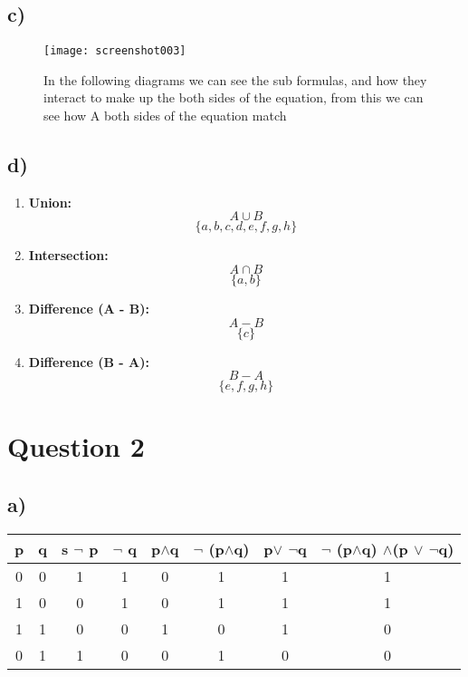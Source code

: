 \documentclass[english,10pt,a4paper]{report}
\begin{document}
\pagebreak
\subsection*{c)}
\begin{figure}[tbph!]
	\centering
	\texttt{[image: screenshot003]}
	\caption{In the following diagrams we can see the sub formulas, and how they interact to make up the both sides of the equation, from this we can see how A both sides of the equation match}
	\label{fig:screenshot003}
\end{figure}

\pagebreak

\subsection*{d)}


\hspace{2cm}
\begin{minipage}{\dimexpr\textwidth-2cm}
	\begin{enumerate}
		\item \textbf{Union:} \\
		\[
		A \cup B
		\]
		\[
		\{a,b,c,d,e,f,g,h\}
		\]
		\item \textbf{Intersection:} \\
		\[
		A \cap B
		\]
		\[
		\{a,b\}
		\]
		\item \textbf{Difference (A - B):} \\
		\[
		A - B
		\]
		\[
		\{c\}
		\]
		\item \textbf{Difference (B - A):} \\
		\[
		B - A
		\]
		\[
		\{e,f,g,h\}
		\]
	\end{enumerate}
\end{minipage}
	


\pagebreak
\section*{Question 2}
\subsection*{a)}
\begin{tabular}{|c|c|c|c|c|c|c|c|}
    \hline
	p & q & s $\neg$ p & $\neg$ q & p$\wedge$q & $\neg$ (p$\wedge$q) &p$\vee$ $\neg$q & $\neg$ (p$\wedge$q) $\wedge$(p $\vee$ $\neg$q)\\
	\hline
	0&0&1&1&0&1&1&1\\
	\hline
	1&0&0&1&0&1&1&1\\
	\hline
	1&1&0&0&1&0&1&0\\
	\hline
	0&1&1&0&0&1&0&0\\
    \hline
    
\end{tabular}\\ 
	
\end{document}

